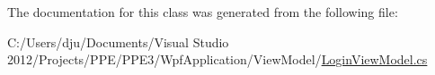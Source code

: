 The documentation for this class was generated from the following file\-:\begin{DoxyCompactItemize}
\item 
C\-:/\-Users/dju/\-Documents/\-Visual Studio 2012/\-Projects/\-P\-P\-E/\-P\-P\-E3/\-Wpf\-Application/\-View\-Model/\hyperlink{_login_view_model_8cs}{Login\-View\-Model.\-cs}\end{DoxyCompactItemize}
